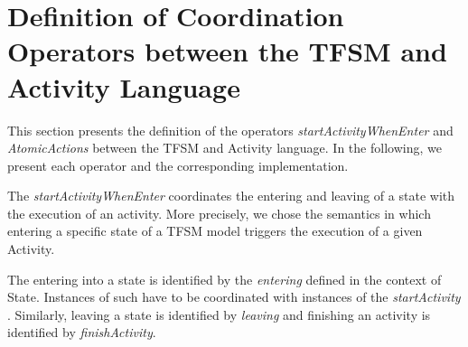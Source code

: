 \section{Definition of Coordination Operators between the TFSM and Activity Language}

This section presents the definition of the operators \emph{startActivityWhenEnter} and \emph{AtomicActions} between the TFSM and Activity language. In the following, we present each operator and the corresponding \bcool implementation. 

The \emph{startActivityWhenEnter} coordinates the entering and leaving of a state with the execution of an activity. More precisely, we chose the semantics in which entering a specific state of a TFSM model triggers the execution of a given Activity. 


The entering into a state is identified by the \textit{entering} \dse defined in the context of State. Instances of such \dse have to be coordinated with instances of the \textit{startActivity} \dse. Similarly, leaving a state is identified by \dse \textit{leaving} and finishing an activity is identified by \dse \textit{finishActivity}. 


